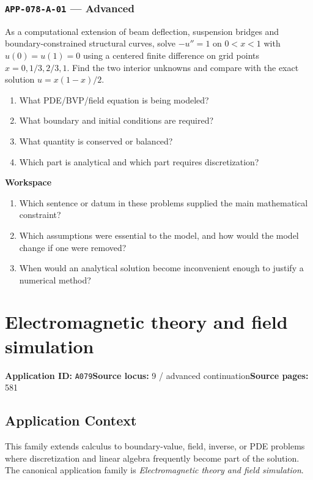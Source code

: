 \documentclass[11pt]{book}
\newcommand{\pid}[1]{\texttt{#1}}
\newcommand{\workspace}{\par\vspace{0.7in}\hrulefill\par\vspace{0.55in}\hrulefill\par}
\begin{document}
\subsection*{\pid{APP-078-A-01} — Advanced}
\begin{problembox}
As a computational extension of beam deflection, suspension bridges and boundary-constrained structural curves, solve $-u''=1$ on $0<x<1$ with $u(0)=u(1)=0$ using a centered finite difference on grid points $x=0,1/3,2/3,1$. Find the two interior unknowns and compare with the exact solution $u=x(1-x)/2$.
\end{problembox}
\begin{promptbox}\begin{enumerate}
\item What PDE/BVP/field equation is being modeled?
\item What boundary and initial conditions are required?
\item What quantity is conserved or balanced?
\item Which part is analytical and which part requires discretization?
\end{enumerate}\end{promptbox}
\textbf{Workspace}\workspace
\begin{reflectionbox}\begin{enumerate}
\item Which sentence or datum in these problems supplied the main mathematical constraint?
\item Which assumptions were essential to the model, and how would the model change if one were removed?
\item When would an analytical solution become inconvenient enough to justify a numerical method?
\end{enumerate}\end{reflectionbox}
\chapter{Electromagnetic theory and field simulation}\label{app:A079}
\textbf{Application ID:} \pid{A079}\quad \textbf{Source locus:} 9 / advanced continuation\quad \textbf{Source pages:} 581
\section*{Application Context}
This family extends calculus to boundary-value, field, inverse, or PDE problems where discretization and linear algebra frequently become part of the solution. The canonical application family is \emph{Electromagnetic theory and field simulation}.
\end{document}
